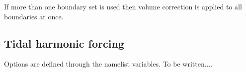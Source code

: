\documentclass[../tex_main/NEMO_manual]{subfiles}
\begin{document}
If more than one boundary set is used then volume correction is
applied to all boundaries at once.

\newpage
\subsection{Tidal harmonic forcing}
\label{subsec:BDY_tides}


Options are defined through the   namelist variables.
 To be written....
\end{document}
